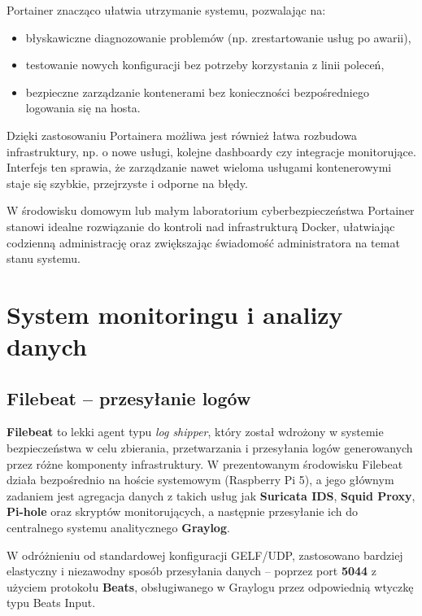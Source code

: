 \documentclass[
    left=2.5cm,         %
    right=2.5cm,        %
    top=2.5cm,          %
    bottom=3cm,         %
    bindingoffset=6mm,  %
    nohyphenation=true %
]{eiti/eiti-thesis} %
\begin{document}
Portainer znacząco ułatwia utrzymanie systemu, pozwalając na:
\begin{itemize}
    \item błyskawiczne diagnozowanie problemów (np. zrestartowanie usług po awarii),
    \item testowanie nowych konfiguracji bez potrzeby korzystania z linii poleceń,
    \item bezpieczne zarządzanie kontenerami bez konieczności bezpośredniego logowania się na hosta.
\end{itemize}

Dzięki zastosowaniu Portainera możliwa jest również łatwa rozbudowa infrastruktury, np. o nowe usługi, kolejne dashboardy czy integracje monitorujące. Interfejs ten sprawia, że zarządzanie nawet wieloma usługami kontenerowymi staje się szybkie, przejrzyste i odporne na błędy.

W środowisku domowym lub małym laboratorium cyberbezpieczeństwa Portainer stanowi idealne rozwiązanie do kontroli nad infrastrukturą Docker, ułatwiając codzienną administrację oraz zwiększając świadomość administratora na temat stanu systemu.


\newpage 
\section{System monitoringu i analizy danych}

\subsection{Filebeat – przesyłanie logów}

\textbf{Filebeat}\cite{filebeat-docs} to lekki agent typu \textit{log shipper}, który został wdrożony w systemie bezpieczeństwa w celu zbierania, przetwarzania i przesyłania logów generowanych przez różne komponenty infrastruktury. W prezentowanym środowisku Filebeat działa bezpośrednio na hoście systemowym (Raspberry Pi 5), a jego głównym zadaniem jest agregacja danych z takich usług jak \textbf{Suricata IDS}, \textbf{Squid Proxy}, \textbf{Pi-hole} oraz skryptów monitorujących, a następnie przesyłanie ich do centralnego systemu analitycznego \textbf{Graylog}.

W odróżnieniu od standardowej konfiguracji GELF/UDP, zastosowano bardziej elastyczny i niezawodny sposób przesyłania danych – poprzez port \textbf{5044} z użyciem protokołu \textbf{Beats}, obsługiwanego w Graylogu przez odpowiednią wtyczkę typu Beats Input.
\end{document}
